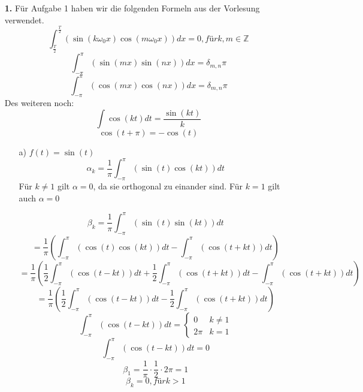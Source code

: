 \documentclass [a4paper,11pt]{article}
\author{\authorinfotitle}
\title{\titleinfo}
\date{\today}
\begin{document}
\maketitle
    \begin{enumerate}
        \item[\textbf{1.}]
        	Für Aufgabe 1 haben wir die folgenden Formeln aus der Vorlesung verwendet.
        	\begin{equation}
        	\int_{\frac{T}{2}}^{\frac{T}{2}}(\sin(k\omega_0x)\cos(m\omega_0x))dx = 0, für k,m\in \mathbb{Z}        	
        	\end{equation}
        	\begin{equation}
        	\int_{-\pi}^{\pi}(\sin(mx)\sin(nx))dx = \delta_{m,n}\pi
        	\end{equation}
        	\begin{equation}
        	\int_{-\pi}^{\pi}(\cos(mx)\cos(nx))dx = \delta_{m,n}\pi
        	\end{equation}
        	Des weiteren noch:
        	\begin{equation}
        	\int \cos(kt)dt = \frac{\sin(kt)}{k}
        	\end{equation}
        	\begin{equation}
        	\cos(t+\pi) = -\cos(t)
        	\end{equation}
            \begin{enumerate}
                \item[a)] $f(t) = \sin(t)$
              	$$\alpha_k = \frac{1}{\pi} \int_{-\pi}^{\pi}(\sin(t)\cos(kt))dt$$
              	Für $k\neq 1$ gilt $\alpha=0$, da sie orthogonal zu einander sind.
              	Für $k = 1$ gilt auch $\alpha=0$
              	
              	$$\beta_k = \frac{1}{\pi} \int_{-\pi}^{\pi}(\sin(t)\sin(kt))dt$$
              	$$  = \frac{1}{\pi} \left(  \int_{-\pi}^{\pi}(\cos(t)\cos(kt))dt-\int_{-\pi}^{\pi}(\cos(t+kt))dt\right) $$
              	$$  = \frac{1}{\pi} \left(  \frac{1}{2}\int_{-\pi}^{\pi}(\cos(t-kt))dt +\frac{1}{2}\int_{-\pi}^{\pi}(\cos(t+kt))dt -\int_{-\pi}^{\pi}(\cos(t+kt))dt\right) $$
              	$$  = \frac{1}{\pi} \left(  \frac{1}{2}\int_{-\pi}^{\pi}(\cos(t-kt))dt-\frac{1}{2}\int_{-\pi}^{\pi}(\cos(t+kt))dt\right) $$
              	$$\int_{-\pi}^{\pi}(\cos(t-kt))dt = 
              	\begin{cases}
					0 & k \neq 1\\
					2\pi & k = 1              	
              	\end{cases}$$
              	$$\int_{-\pi}^{\pi}(\cos(t-kt))dt = 0 $$
              	$$\beta_1 = \frac{1}{\pi} \cdot \frac{1}{2} \cdot 2\pi = 1$$
              	$$\beta_k = 0, für k > 1$$
              	

\end{enumerate}
\end{enumerate}
\end{document}

